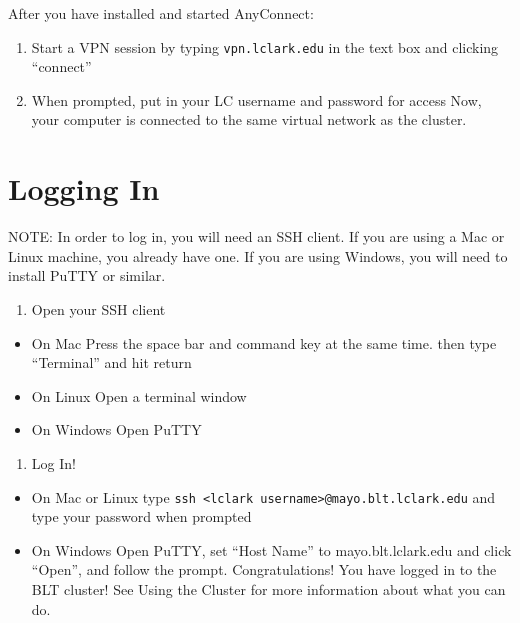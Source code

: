 \documentclass[]{book}
\providecommand{\tightlist}{%
  \setlength{\itemsep}{0pt}\setlength{\parskip}{0pt}}
\begin{document}
After you have installed and started AnyConnect:

\begin{enumerate}
\def\labelenumi{\arabic{enumi}.}
\tightlist
\item
  Start a VPN session by typing \texttt{vpn.lclark.edu} in the text box
  and clicking ``connect''
\item
  When prompted, put in your LC username and password for access Now,
  your computer is connected to the same virtual network as the cluster.
\end{enumerate}

\section{Logging In}\label{logging-in}

NOTE: In order to log in, you will need an SSH client. If you are using
a Mac or Linux machine, you already have one. If you are using Windows,
you will need to install PuTTY or similar.

\begin{enumerate}
\def\labelenumi{\arabic{enumi}.}
\tightlist
\item
  Open your SSH client
\end{enumerate}

\begin{itemize}
\tightlist
\item
  On Mac Press the space bar and command key at the same time. then type
  ``Terminal'' and hit return
\item
  On Linux Open a terminal window
\item
  On Windows Open PuTTY
\end{itemize}

\begin{enumerate}
\def\labelenumi{\arabic{enumi}.}
\setcounter{enumi}{1}
\tightlist
\item
  Log In!
\end{enumerate}

\begin{itemize}
\tightlist
\item
  On Mac or Linux type
  \texttt{ssh\ \textless{}lclark\ username\textgreater{}@mayo.blt.lclark.edu}
  and type your password when prompted
\item
  On Windows Open PuTTY, set ``Host Name'' to mayo.blt.lclark.edu and
  click ``Open'', and follow the prompt. Congratulations! You have
  logged in to the BLT cluster! See Using the Cluster for more
  information about what you can do.
\end{itemize}
\end{document}
